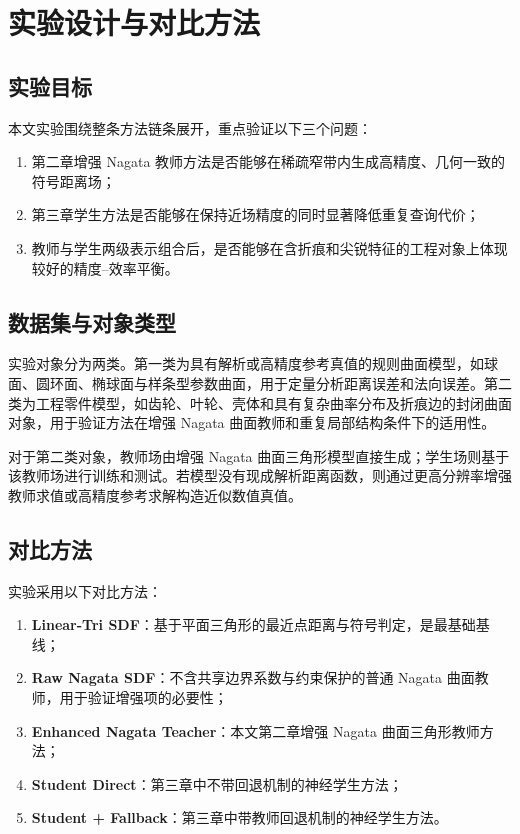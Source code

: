 \documentclass[12pt,oneside]{ctexbook}
\begin{document}
\chapter{实验设计与对比方法}
\section{实验目标}
本文实验围绕整条方法链条展开，重点验证以下三个问题：
\begin{enumerate}[label=\arabic*)]
  \item 第二章增强 Nagata 教师方法是否能够在稀疏窄带内生成高精度、几何一致的符号距离场；
  \item 第三章学生方法是否能够在保持近场精度的同时显著降低重复查询代价；
  \item 教师与学生两级表示组合后，是否能够在含折痕和尖锐特征的工程对象上体现较好的精度--效率平衡。
\end{enumerate}

\section{数据集与对象类型}
实验对象分为两类。第一类为具有解析或高精度参考真值的规则曲面模型，如球面、圆环面、椭球面与样条型参数曲面，用于定量分析距离误差和法向误差。第二类为工程零件模型，如齿轮、叶轮、壳体和具有复杂曲率分布及折痕边的封闭曲面对象，用于验证方法在增强 Nagata 曲面教师和重复局部结构条件下的适用性。

对于第二类对象，教师场由增强 Nagata 曲面三角形模型直接生成；学生场则基于该教师场进行训练和测试。若模型没有现成解析距离函数，则通过更高分辨率增强教师求值或高精度参考求解构造近似数值真值。

\section{对比方法}
实验采用以下对比方法：
\begin{enumerate}[label=\arabic*)]
  \item \textbf{Linear-Tri SDF}：基于平面三角形的最近点距离与符号判定，是最基础基线；
  \item \textbf{Raw Nagata SDF}：不含共享边界系数与约束保护的普通 Nagata 曲面教师，用于验证增强项的必要性；
  \item \textbf{Enhanced Nagata Teacher}：本文第二章增强 Nagata 曲面三角形教师方法；
  \item \textbf{Student Direct}：第三章中不带回退机制的神经学生方法；
  \item \textbf{Student + Fallback}：第三章中带教师回退机制的神经学生方法。
\end{enumerate}
\end{document}
